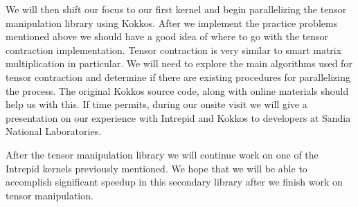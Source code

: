 \documentclass[proposal]{hmcclinic}
\begin{document}
We will then shift our focus to our first kernel and begin parallelizing the tensor 
manipulation library using Kokkos.  After we implement
the practice problems mentioned above we should have a good idea of where to go
with the tensor contraction implementation. Tensor contraction is very similar
to smart matrix multiplication in particular.  We will need to explore the main
algorithms used for tensor contraction and determine if there are existing
procedures for parallelizing the process. The original Kokkos source code, along
with online materials should help us with this. If time permits, during our onsite visit
we will give a presentation on our experience with Intrepid and Kokkos to developers
at Sandia National Laboratories.

After the tensor manipulation library we will continue work on one of the
Intrepid kernels previously mentioned. We hope that we will be able to
accomplish significant speedup in this secondary library after we finish work on
tensor manipulation.







\end{document}
